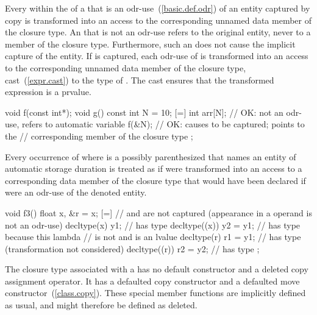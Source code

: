 \pnum
Every  within the  of a
 that is an odr-use~(\ref{basic.def.odr}) of an
entity captured by copy is transformed into an access to the corresponding unnamed data
member of the closure type.
\enternote An  that is not an odr-use refers to
the original entity, never to a member of the closure type. Furthermore, such
an  does not cause the implicit capture of the
entity. \exitnote
If  is captured, each odr-use of  is
transformed into an access to the corresponding unnamed data member of the closure type,
cast~(\ref{expr.cast}) to the type of . \enternote The cast ensures that the
transformed expression is a prvalue. \exitnote \enterexample
\begin{codeblock}
void f(const int*);
void g() {
  const int N = 10;
  [=] {
    int arr[N];             // OK: not an odr-use, refers to automatic variable
    f(&N);                  // OK: causes  to be captured;  points to the
                            // corresponding member of the closure type
  };
}
\end{codeblock}
\exitexample

\pnum
Every occurrence of  where  is a possibly
parenthesized  that names an entity of automatic storage
duration is treated as if  were transformed into an access to a corresponding
data member of the closure type that would have been declared if  were an odr-use of
the denoted entity. \enterexample

\begin{codeblock}
void f3() {
  float x, &r = x;
  [=] {                     //  and  are not captured (appearance in a  operand is not an odr-use)
    decltype(x) y1;         //  has type 
    decltype((x)) y2 = y1;  //  has type  because this lambda
                            // is not  and  is an lvalue
    decltype(r) r1 = y1;    //  has type  (transformation not considered)
    decltype((r)) r2 = y2;  //  has type 
  };
}
\end{codeblock}
\exitexample

\pnum
The closure type associated with a  has no
default constructor and a deleted copy assignment operator. It has a
defaulted copy constructor and a defaulted move constructor~(\ref{class.copy}).
\enternote These special member functions are implicitly defined as
usual, and might therefore be defined as deleted. \exitnote

